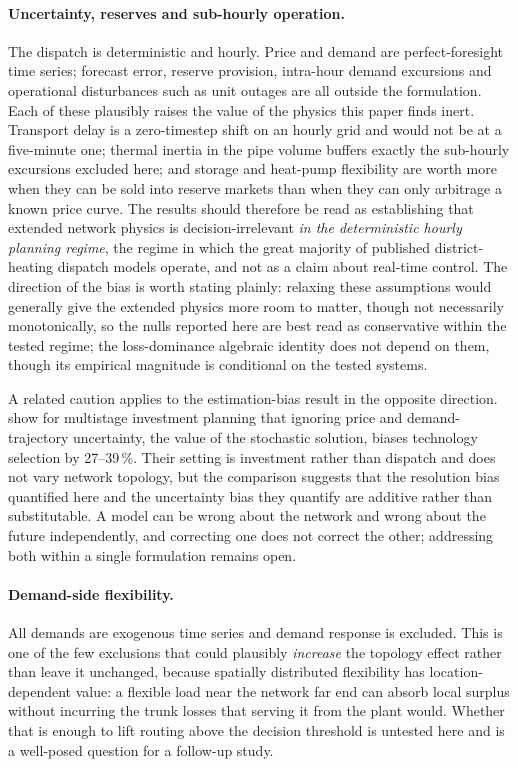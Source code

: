 \documentclass[a4paper,fleqn]{cas-sc}
\providecommand{\citet}[1]{\cite{#1}}
\begin{document}
\paragraph{Uncertainty, reserves and sub-hourly operation.}
The dispatch is deterministic and hourly. Price and demand are perfect-foresight time
series; forecast error, reserve provision, intra-hour demand excursions and operational
disturbances such as unit outages are all outside the formulation. Each of these plausibly
raises the value of the physics this paper finds inert. Transport delay is a zero-timestep
shift on an hourly grid and would not be at a five-minute one; thermal inertia in the pipe
volume buffers exactly the sub-hourly excursions excluded here; and storage and heat-pump
flexibility are worth more when they can be sold into reserve markets than when they can
only arbitrage a known price curve. The results should therefore be read as establishing
that extended network physics is decision-irrelevant \emph{in the deterministic hourly
planning regime}, the regime in which the great majority of published district-heating
dispatch models operate, and not as a claim about real-time control. The direction of
the bias is worth stating plainly: relaxing these assumptions would generally give the
extended physics more room to matter, though not necessarily monotonically, so the nulls
reported here are best read as conservative within the tested regime; the loss-dominance
algebraic identity does not depend on them, though its empirical magnitude is conditional on
the tested systems.

A related caution applies to the estimation-bias result in the opposite direction.
\citet{Koek2026} show for multistage investment planning that ignoring price and
demand-trajectory uncertainty, the value of the stochastic solution, biases technology
selection by 27--39\,\%. Their setting is investment rather than dispatch and does not
vary network topology, but the comparison suggests that the resolution bias quantified
here and the uncertainty bias they quantify are additive rather than substitutable. A
model can be wrong about the network and wrong about the future independently, and
correcting one does not correct the other; addressing both within a single formulation
remains open.

\paragraph{Demand-side flexibility.}
All demands are exogenous time series and demand response is excluded. This is one of the
few exclusions that could plausibly \emph{increase} the topology effect rather than leave
it unchanged, because spatially distributed flexibility has location-dependent value: a
flexible load near the network far end can absorb local surplus without incurring the
trunk losses that serving it from the plant would. Whether that is enough to lift routing
above the decision threshold is untested here and is a well-posed question for a follow-up
study.
\end{document}
